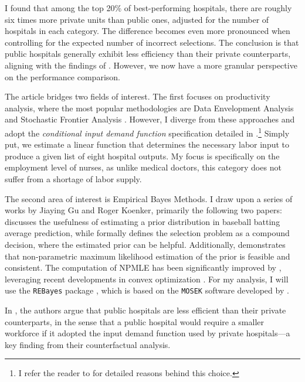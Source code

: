 \documentclass[12pt]{article}
\begin{document}
I found that among the top 20\% of best-performing hospitals, there are roughly
six times more private units than public ones, adjusted for the number of
hospitals in each category. The difference becomes even more pronounced when
controlling for the expected number of incorrect selections. The conclusion is
that public hospitals generally exhibit less efficiency than their private
counterparts, aligning with the findings of \cite{croiset2024hospitals}.
However, we now have a more granular perspective on the performance comparison.

The article bridges two fields of interest. The first focuses on productivity
analysis, where the most popular methodologies are Data Envelopment Analysis
\citep{charnes1978measuring} and Stochastic Frontier Analysis
\citep{aigner1977formulation,meeusen1977efficiency}. However, I diverge from
these approaches and adopt the \textit{conditional input demand function}
specification detailed in \cite{croiset2024hospitals}.\footnote{I refer the
    reader to \citet{croiset2024hospitals} for detailed reasons behind this
    choice.} Simply put, we estimate a linear function that determines the
necessary labor input to produce a given list of eight hospital outputs. My
focus is specifically on the employment level of nurses, as unlike medical
doctors, this category does not suffer from a shortage of labor supply.

The second area of interest is Empirical Bayes Methods. I draw upon a series of
works by Jiaying Gu and Roger Koenker, primarily the following two papers:
\citet{gu2017empirical} discusses the usefulness of estimating a prior
distribution in baseball batting average prediction, while
\citet{gu2023invidious} formally defines the selection problem as a compound
decision, where the estimated prior can be helpful. Additionally,
\citet{kiefer1956consistency} demonstrates that non-parametric maximum
likelihood estimation of the prior is feasible and consistent. The computation
of NPMLE has been significantly improved by \citet{koenker2014convex},
leveraging recent developments in convex optimization
\citep{andersen2010mosek}. For my analysis, I will use the \verb+REBayes+
package \citep{koenker2017rebayes}, which is based on the \verb+MOSEK+ software
developed by \citet{andersen2010mosek}.

In \cite{croiset2024hospitals}, the authors argue that public hospitals are
less efficient than their private counterparts, in the sense that a public
hospital would require a smaller workforce if it adopted the input demand
function used by private hospitals—a key finding from their counterfactual
analysis.
\end{document}
